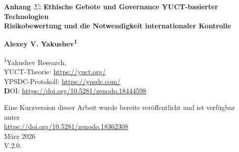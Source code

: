 \documentclass[12pt,a4paper]{article}
\theoremstyle{remark}
\begin{document}
	
	\begin{titlepage}
		\begin{center}
			\vspace*{1cm}
			
			\Huge\textbf{Anhang $\Sigma$: Ethische Gebote und Governance YUCT-basierter Technologien} \\
			\vspace{0.5cm}
			\Large\textbf{Risikobewertung und die Notwendigkeit internationaler Kontrolle}
			
			\vspace{1.5cm}
			
			\Large\textbf{Alexey V. Yakushev\textsuperscript{1}}
			
			\vspace{0.3cm}
			\large
			\textsuperscript{1}Yakushev Research, \\ 
			YUCT-Theorie: \url{https://yuct.org/}\\
			YPSDC-Protokoll: \url{https://ypsdc.com/}\\
			
			\vspace{2cm}
			\textbf DOI: \url{https://doi.org/10.5281/zenodo.18444598}\\
			
			\vspace{1cm}
			
			\vspace{0cm}
			\large 
			Eine Kurzversion dieser Arbeit wurde bereits veröffentlicht und ist verfügbar unter\\ \url{https://doi.org/10.5281/zenodo.18362308}\\
			\vspace{1cm}
			März 2026 \\ \large V.2.0.
			

\end{center}
\end{titlepage}
\end{document}
